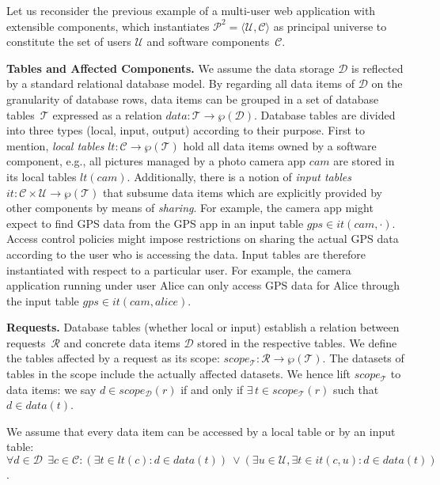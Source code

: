 \documentclass{src/acm_proc_article-sp} \else
\newcommand\myparagraph[1]{\medskip\noindent\textbf{#1.}}
\newcommand\cC{\ensuremath{\mathcal{C}}\xspace}
\newcommand\cD{\ensuremath{\mathcal{D}}\xspace}
\newcommand\cP{\ensuremath{\mathcal{P}}\xspace}
\newcommand\cT{\ensuremath{\mathcal{T}}\xspace}
\newcommand\cR{\ensuremath{\mathcal{R}}\xspace}
\newcommand\cU{\ensuremath{\mathcal{U}}\xspace}
\begin{document}
Let us reconsider the previous example of a multi-user web
application with extensible components, which
instantiates
$\cP^2 = \langle \cU, \cC \rangle$
as principal universe to constitute the set of users $\cU$ and
software components~$\cC$.


\myparagraph{Tables and Affected Components}
We assume the data storage $\cD$ is reflected by a standard
relational database model. By regarding all data items of
\cD on the granularity of database rows, data items can be
grouped in a set of database tables~\cT expressed as a
relation
$\mathit{data} \colon \cT \rightarrow \wp(\cD).$
Database tables are divided into three types (local,
input, output) according to their purpose.
First to mention,
\emph{local tables}
$\mathit{lt} \colon \cC \rightarrow \wp(\cT)$
hold all data items owned by a software component, e.g., all
pictures managed by a photo camera app $\mathit{cam}$ are
stored in its local tables $\mathit{lt}(\mathit{cam})$.
Additionally, there is a notion of \emph{input tables}
$ \mathit{it} \colon \cC \times \cU \rightarrow \wp(\cT) $
that subsume data items
which are explicitly provided by other components by means
of \emph{sharing}. For example, the camera app might expect
to find GPS data from the GPS app in an input table
$\mathit{gps}\in\mathit{it}(\mathit{cam},\cdot)$.
Access control policies might impose restrictions on sharing
the actual GPS data according to the user who is accessing
the data. Input tables are therefore instantiated with
respect to a particular user. For example, the camera
application running under user Alice can only access GPS
data for Alice through the input table $\mathit{gps} \in
\mathit{it}(\mathit{cam},\mathit{alice})$.



\myparagraph{Requests}
Database tables (whether local or input) establish a
relation between requests~\cR and concrete data items $\cD$
stored in the respective tables. We define the tables
affected by a request as its scope:
$ \mathit{scope_{\cT}} \colon \cR \rightarrow \wp(\cT) $.
The datasets of tables in the scope include the actually
affected datasets. We hence lift $\mathit{scope_\cT}$ to data
items: we say $d \in \mathit{scope_{\cD}(r)}$ if and only if
$\exists\,t \in \mathit{scope_{\cT}(r)}$ such that $d \in
\mathit{data(t)}$.

We assume that every data item can be accessed by a local
table or by an input table:
$
    \forall d \in \cD \,\; \exists c \in \cC \colon (\exists t \in \mathit{lt(c)} \colon d \in \mathit{data(t)}) \:\vee 
                          (\exists u \in \cU, \exists t \in \mathit{it(c, u)} \colon d \in \mathit{data(t)})
$.
\end{document}
